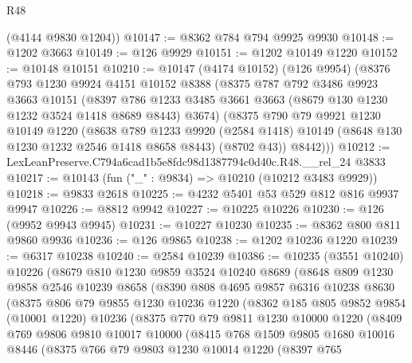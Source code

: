 \begin{lexlean}{R48}
\begin{coremodule}
      (@4144 @9830 @1204))
@10147 := @8362 @784 @794 @9925 @9930
@10148 := @1202 @3663
@10149 := @126 @9929
@10151 := @1202 @10149 @1220
@10152 := @10148 @10151
@10210 := @10147
    (@4174 @10152)
    (@126 @9954)
    (@8376
      @793
      @1230
      @9924
      @4151
      @10152
      @8388
      (@8375
        @787
        @792
        @3486
        @9923
        @3663
        @10151
        (@8397 @786 @1233 @3485 @3661 @3663 (@8679 @130 @1230 @1232 @3524 @1418 @8689 @8443) @3674)
        (@8375
          @790
          @79
          @9921
          @1230
          @10149
          @1220
          (@8638
            @789
            @1233
            @9920
            (@2584 @1418)
            @10149
            (@8648 @130 @1230 @1232 @2546 @1418 @8658 @8443)
            (@8702 @43))
          @8442)))
@10212 := LexLeanPreserve.C794a6cad1b5e8fdc98d1387794c0d40c.R48.__rel_24 @3833
@10217 := @10143 (fun ("_" : @9834) => @10210 (@10212 @3483 @9929))
@10218 := @9833 @2618
@10225 := @4232 @5401 @53 @529 @812 @816 @9937 @9947
@10226 := @8812 @9942
@10227 := @10225 @10226
@10230 := @126 (@9952 @9943 @9945)
@10231 := @10227 @10230
@10235 := @8362 @800 @811 @9860 @9936
@10236 := @126 @9865
@10238 := @1202 @10236 @1220
@10239 := @6317 @10238
@10240 := @2584 @10239
@10386 := @10235
    (@3551 @10240)
    @10226
    (@8679
      @810
      @1230
      @9859
      @3524
      @10240
      @8689
      (@8648
        @809
        @1230
        @9858
        @2546
        @10239
        @8658
        (@8390
          @808
          @4695
          @9857
          @6316
          @10238
          @8630
          (@8375
            @806
            @79
            @9855
            @1230
            @10236
            @1220
            (@8362
              @185
              @805
              @9852
              @9854
              (@10001 @1220)
              @10236
              (@8375
                @770
                @79
                @9811
                @1230
                @10000
                @1220
                (@8409
                  @769
                  @9806
                  @9810
                  @10017
                  @10000
                  (@8415
                    @768
                    @1509
                    @9805
                    @1680
                    @10016
                    @8446
                    (@8375
                      @766
                      @79
                      @9803
                      @1230
                      @10014
                      @1220
                      (@8397
                        @765

\end{coremodule}
\end{lexlean}
